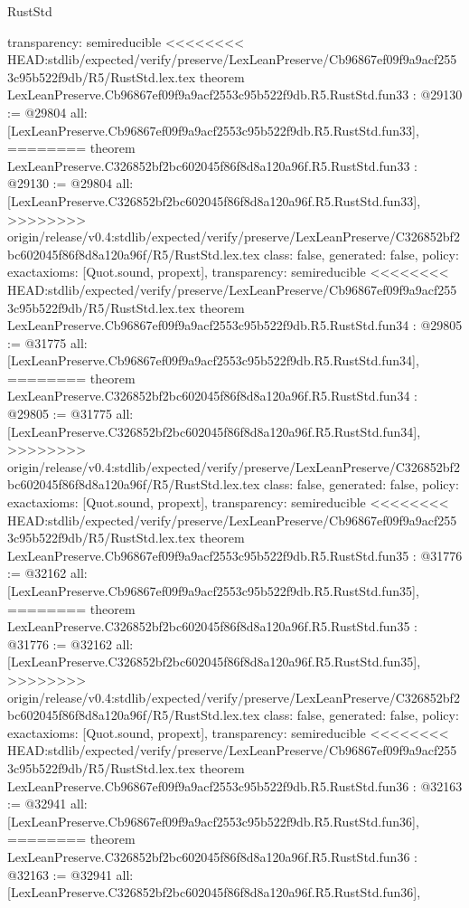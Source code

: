 \begin{lexlean}{RustStd}
\begin{coremodule}
{\begin{coremodule}
{{{{{{{{{{{{{{{{{{{{{{{{{{{{{{{{{{{{  transparency: semireducible
}
<<<<<<<< HEAD:stdlib/expected/verify/preserve/LexLeanPreserve/Cb96867ef09f9a9acf2553c95b522f9db/R5/RustStd.lex.tex
theorem LexLeanPreserve.Cb96867ef09f9a9acf2553c95b522f9db.R5.RustStd.fun33 : @29130 := @29804 {
  all: [LexLeanPreserve.Cb96867ef09f9a9acf2553c95b522f9db.R5.RustStd.fun33],
========
theorem LexLeanPreserve.C326852bf2bc602045f86f8d8a120a96f.R5.RustStd.fun33 : @29130 := @29804 {
  all: [LexLeanPreserve.C326852bf2bc602045f86f8d8a120a96f.R5.RustStd.fun33],
>>>>>>>> origin/release/v0.4:stdlib/expected/verify/preserve/LexLeanPreserve/C326852bf2bc602045f86f8d8a120a96f/R5/RustStd.lex.tex
  class: false,
  generated: false,
  policy: exact{axioms: [Quot.sound, propext]},
  transparency: semireducible
}
<<<<<<<< HEAD:stdlib/expected/verify/preserve/LexLeanPreserve/Cb96867ef09f9a9acf2553c95b522f9db/R5/RustStd.lex.tex
theorem LexLeanPreserve.Cb96867ef09f9a9acf2553c95b522f9db.R5.RustStd.fun34 : @29805 := @31775 {
  all: [LexLeanPreserve.Cb96867ef09f9a9acf2553c95b522f9db.R5.RustStd.fun34],
========
theorem LexLeanPreserve.C326852bf2bc602045f86f8d8a120a96f.R5.RustStd.fun34 : @29805 := @31775 {
  all: [LexLeanPreserve.C326852bf2bc602045f86f8d8a120a96f.R5.RustStd.fun34],
>>>>>>>> origin/release/v0.4:stdlib/expected/verify/preserve/LexLeanPreserve/C326852bf2bc602045f86f8d8a120a96f/R5/RustStd.lex.tex
  class: false,
  generated: false,
  policy: exact{axioms: [Quot.sound, propext]},
  transparency: semireducible
}
<<<<<<<< HEAD:stdlib/expected/verify/preserve/LexLeanPreserve/Cb96867ef09f9a9acf2553c95b522f9db/R5/RustStd.lex.tex
theorem LexLeanPreserve.Cb96867ef09f9a9acf2553c95b522f9db.R5.RustStd.fun35 : @31776 := @32162 {
  all: [LexLeanPreserve.Cb96867ef09f9a9acf2553c95b522f9db.R5.RustStd.fun35],
========
theorem LexLeanPreserve.C326852bf2bc602045f86f8d8a120a96f.R5.RustStd.fun35 : @31776 := @32162 {
  all: [LexLeanPreserve.C326852bf2bc602045f86f8d8a120a96f.R5.RustStd.fun35],
>>>>>>>> origin/release/v0.4:stdlib/expected/verify/preserve/LexLeanPreserve/C326852bf2bc602045f86f8d8a120a96f/R5/RustStd.lex.tex
  class: false,
  generated: false,
  policy: exact{axioms: [Quot.sound, propext]},
  transparency: semireducible
}
<<<<<<<< HEAD:stdlib/expected/verify/preserve/LexLeanPreserve/Cb96867ef09f9a9acf2553c95b522f9db/R5/RustStd.lex.tex
theorem LexLeanPreserve.Cb96867ef09f9a9acf2553c95b522f9db.R5.RustStd.fun36 : @32163 := @32941 {
  all: [LexLeanPreserve.Cb96867ef09f9a9acf2553c95b522f9db.R5.RustStd.fun36],
========
theorem LexLeanPreserve.C326852bf2bc602045f86f8d8a120a96f.R5.RustStd.fun36 : @32163 := @32941 {
  all: [LexLeanPreserve.C326852bf2bc602045f86f8d8a120a96f.R5.RustStd.fun36],
}}}}}}}}}}}}}}}}}}}}}}}}}}}}}}}}}}}}}}}}
\end{coremodule}}
\end{coremodule}
\end{lexlean}
